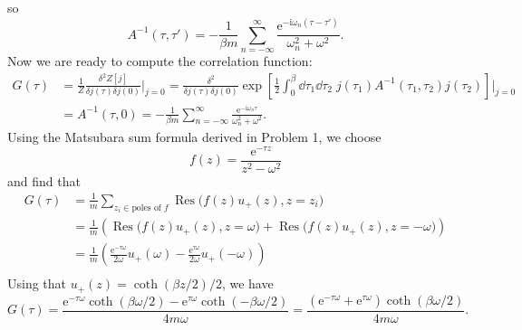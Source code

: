 \documentclass{article}
\newcommand{\ii}{\mathrm{i}}
\newcommand{\me}{\mathrm{e}}
\begin{document}
so
\begin{equation}
    A^{-1}(\tau,\tau') = -\frac{1}{\beta m} \sum_{n=-\infty}^{\infty} \frac{\me^{-\ii \omega_n (\tau-\tau')}}{\omega_n^2 + \omega^2}.
\end{equation}
Now we are ready to compute the correlation function:
\begin{equation}
    \begin{split}
        G(\tau) & =\frac{1}{Z}\frac{\delta^2 Z[j]}{\delta j(\tau)\delta j(0)}\Bigg|_{j=0} = \frac{\delta^2}{\delta j(\tau)\delta j(0)} \exp\left[\frac{1}{2}\int_0^{\beta} \dd{\tau_1} \dd{\tau_2} \; j(\tau_1) A^{-1}(\tau_1,\tau_2) j(\tau_2)\right]\Bigg|_{j=0} \\
                & =A^{-1}(\tau,0) = -\frac{1}{\beta m} \sum_{n=-\infty}^{\infty} \frac{\me^{-\ii \omega_n \tau}}{\omega_n^2 + \omega^2}.
    \end{split}
\end{equation}
Using the Matsubara sum formula derived in Problem 1, we choose 
\begin{equation}
    f(z) = \frac{\me^{-\tau z}}{z^2 - \omega^2}
\end{equation}
and find that
\begin{equation}
    \begin{split}
        G(\tau) &= \frac{1}{m}\sum_{z_i\in\text{poles of }f} \operatorname*{Res}\big(f(z)u_+(z), z=z_i\big)\\
                &= \frac{1}{m}(\operatorname*{Res}\big(f(z)u_+(z), z=\omega\big) + \operatorname*{Res}\big(f(z)u_+(z), z=-\omega\big))\\
                &= \frac{1}{m}\left(\frac{\me^{-\tau \omega}}{2\omega}u_+(\omega) - \frac{\me^{\tau \omega}}{2\omega}u_+(-\omega)\right)\\
    \end{split}
\end{equation}
Using that $u_+(z)=\coth(\beta z/2)/2$, we have 
\begin{equation}
    G(\tau) = \frac{\me^{-\tau\omega}\coth(\beta\omega/2)-\me^{\tau\omega}\coth(-\beta\omega/2)}{4m\omega}=\frac{(\me^{-\tau\omega}+\me^{\tau\omega})\coth(\beta\omega/2)}{4m\omega}.
\end{equation}


%
%
\end{document}
